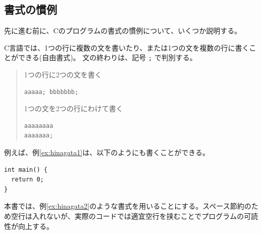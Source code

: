\subsection{書式の慣例}

先に進む前に、Cのプログラムの書式の慣例について、いくつか説明する。

C言語では、1つの行に複数の文を書いたり、または1つの文を複数の行に書くことができる(自由書式)。
文の終わりは、記号 \verb+;+ で判別する。
\begin{quote}
  1つの行に2つの文を書く
%
%
\begin{verbatim}
aaaaa; bbbbbbb;
\end{verbatim}
%
%
  1つの文を2つの行にわけて書く
%
%
\begin{verbatim}
aaaaaaaa
aaaaaaa;
\end{verbatim}
%
%
\end{quote}
例えば、例\ref{ex:hinagata1}は、以下のようにも書くことができる。
\begin{reidai}\label{ex:hinagata2}
\begin{verbatim}
int main() {
  return 0;
}
\end{verbatim}
\end{reidai} \noindent
本書では、例\ref{ex:hinagata2}のような書式を用いることにする。スペース節約のため空行は入れないが、実際のコードでは適宜空行を挟むことでプログラムの可読性が向上する。

